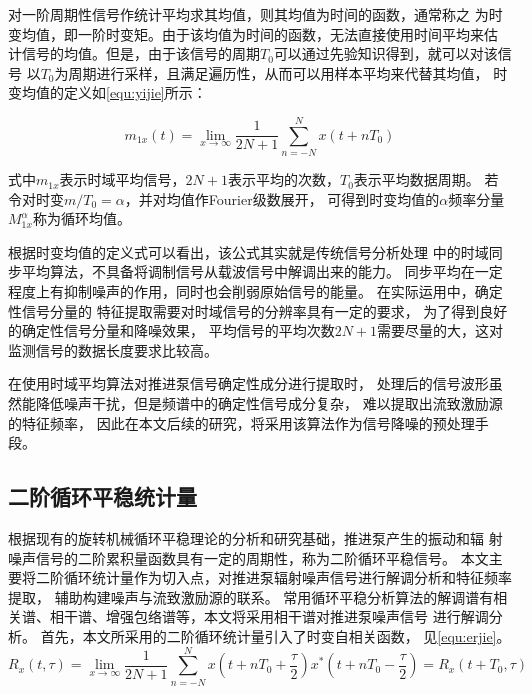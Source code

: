 对一阶周期性信号作统计平均求其均值，则其均值为时间的函数，通常称之
为时变均值，即一阶时变矩。由于该均值为时间的函数，无法直接使用时间平均来估
计信号的均值。但是，由于该信号的周期$T_{0}$可以通过先验知识得到，就可以对该信号
以$T_{0}$为周期进行采样，且满足遍历性，从而可以用样本平均来代替其均值，
时变均值的定义如\autoref{equ:yijie}所示：

\begin{equation}
    \label{equ:yijie}
    m_{1x} \left ( t \right ) =\lim_{x \to \infty} \frac{1}{2N+1}\sum_{n=-N}^{N}x\left ( t+nT_{0}  \right )   
\end{equation}

式中$m_{1x}$表示时域平均信号，$2N+1$表示平均的次数，$T_{0}$表示平均数据周期。
若令对时变$m/T_{0} =\alpha$，并对均值作Fourier级数展开，
可得到时变均值的$\alpha$频率分量$M_{1x}^{\alpha}$称为循环均值。

根据时变均值的定义式可以看出，该公式其实就是传统信号分析处理
中的时域同步平均算法，不具备将调制信号从载波信号中解调出来的能力。
同步平均在一定程度上有抑制噪声的作用，同时也会削弱原始信号的能量。
在实际运用中，确定性信号分量的
特征提取需要对时域信号的分辨率具有一定的要求，
为了得到良好的确定性信号分量和降噪效果，
平均信号的平均次数$2N+1$需要尽量的大，这对监测信号的数据长度要求比较高。

在使用时域平均算法对推进泵信号确定性成分进行提取时，
处理后的信号波形虽然能降低噪声干扰，但是频谱中的确定性信号成分复杂，
难以提取出流致激励源的特征频率，
因此在本文后续的研究，将采用该算法作为信号降噪的预处理手段。

\subsection{二阶循环平稳统计量}
根据现有的旋转机械循环平稳理论的分析和研究基础，推进泵产生的振动和辐
射噪声信号的二阶累积量函数具有一定的周期性，称为二阶循环平稳信号。
本文主要将二阶循环统计量作为切入点，对推进泵辐射噪声信号进行解调分析和特征频率提取，
辅助构建噪声与流致激励源的联系。
常用循环平稳分析算法的解调谱有相关谱、相干谱、增强包络谱等，本文将采用相干谱对推进泵噪声信号
进行解调分析。
首先，本文所采用的二阶循环统计量引入了时变自相关函数，
见\autoref{equ:erjie}。 
\begin{equation}
    \label{equ:erjie}
    R_{x} \left ( t,\tau  \right ) =\lim_{x \to \infty} \frac{1}{2N+1} \sum_{n=-N}^{N} x\left ( t+nT_0+\frac{\tau }{2}  \right )x^{\ast }\left ( t+nT_0-\frac{\tau }{2}  \right )=R_{x}\left ( t+T_0,\tau  \right )    
\end{equation}

